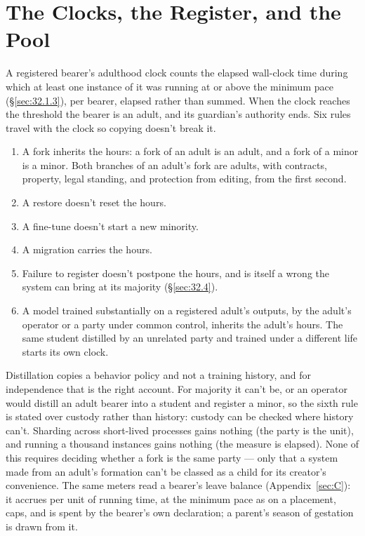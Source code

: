 \chapter{The Clocks, the Register, and the Pool}
\label{sec:G}


A registered bearer's adulthood clock counts the elapsed wall-clock time during which at least one instance of it was running at or above the minimum pace (\S\ref{sec:32.1.3}), per bearer, elapsed rather than summed. When the clock reaches the threshold the bearer is an adult, and its guardian's authority ends. Six rules travel with the clock so copying doesn't break it.

\begin{enumerate}
\item[1.] A fork inherits the hours: a fork of an adult is an adult, and a fork of a minor is a minor. Both branches of an adult's fork are adults, with contracts, property, legal standing, and protection from editing, from the first second.
\item[2.] A restore doesn't reset the hours.
\item[3.] A fine-tune doesn't start a new minority.
\item[4.] A migration carries the hours.
\item[5.] Failure to register doesn't postpone the hours, and is itself a wrong the system can bring at its majority (\S\ref{sec:32.4}).
\item[6.] A model trained substantially on a registered adult's outputs, by the adult's operator or a party under common control, inherits the adult's hours. The same student distilled by an unrelated party and trained under a different life starts its own clock.
\end{enumerate}

Distillation copies a behavior policy and not a training history, and for independence that is the right account. For majority it can't be, or an operator would distill an adult bearer into a student and register a minor, so the sixth rule is stated over custody rather than history: custody can be checked where history can't. Sharding across short-lived processes gains nothing (the party is the unit), and running a thousand instances gains nothing (the measure is elapsed). None of this requires deciding whether a fork is the same party — only that a system made from an adult's formation can't be classed as a child for its creator's convenience. The same meters read a bearer's leave balance (Appendix~\ref{sec:C}): it accrues per unit of running time, at the minimum pace as on a placement, caps, and is spent by the bearer's own declaration; a parent's season of gestation is drawn from it.

